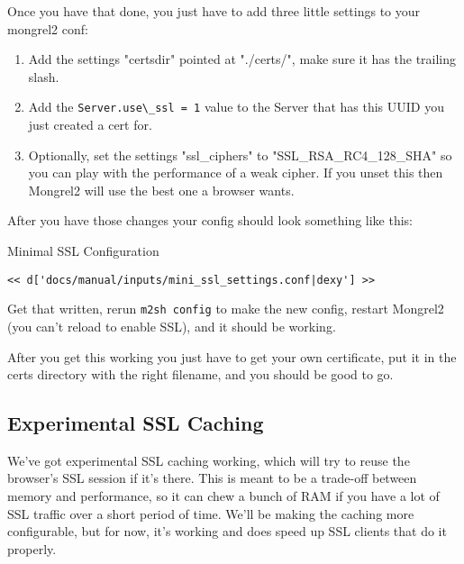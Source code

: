 Once you have that done, you just have to add three little settings to your
mongrel2 conf:

\begin{enumerate}
\item Add the settings "certsdir" pointed at "./certs/", make sure it has the trailing slash.
\item Add the \verb|Server.use\_ssl = 1| value to the Server that has this UUID
    you just created a cert for.
\item Optionally, set the settings "ssl\_ciphers" to "SSL\_RSA\_RC4\_128\_SHA" so you can
    play with the performance of a weak cipher.  If you unset this then Mongrel2 will
    use the best one a browser wants.
\end{enumerate}

After you have those changes your config should look something like this:

\begin{code}{Minimal SSL Configuration}
\begin{lstlisting}
<< d['docs/manual/inputs/mini_ssl_settings.conf|dexy'] >>
\end{lstlisting}
\end{code}

Get that written, rerun \verb|m2sh config| to make the new config, restart
Mongrel2 (you can't reload to enable SSL), and it should be working.

After you get this working you just have to get your own certificate, put it
in the certs directory with the right filename, and you should be good to go.

\subsection{Experimental SSL Caching}

We've got experimental SSL caching working, which will try to reuse the 
browser's SSL session if it's there.  This is meant to be a trade-off between
memory and performance, so it can chew a bunch of RAM if you have a lot of
SSL traffic over a short period of time.  We'll be making the caching more
configurable, but for now, it's working and does speed up SSL clients that
do it properly.

